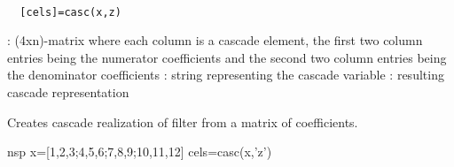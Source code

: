 
\begin{mandesc}
   \\ %
\end{mandesc}
\begin{calling_sequence}
\begin{verbatim}
  [cels]=casc(x,z)  
\end{verbatim}
\end{calling_sequence}
\begin{parameters}
  \begin{varlist}
    : (4xn)-matrix where each column is a cascade element, the first two column entries being the numerator coefficients and the second two column entries being the denominator coefficients
    : string representing the cascade variable
    : resulting cascade representation
  \end{varlist}
\end{parameters}
\begin{mandescription}
  Creates cascade realization of filter from a matrix of coefficients.
\end{mandescription}
\begin{examples}
  \begin{mintednsp}{nsp}
    x=[1,2,3;4,5,6;7,8,9;10,11,12]
    cels=casc(x,'z')
  \end{mintednsp}
\end{examples}
